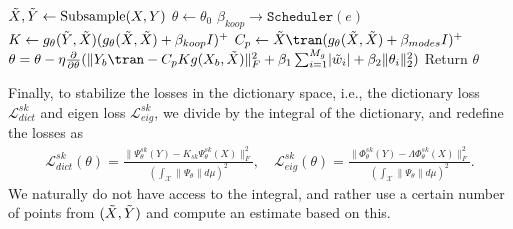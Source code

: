 \documentclass{article}
\begin{document}
\begin{minipage}{1.0\linewidth}
    \begin{algorithm}[H]
        \caption{Dictionary learning for kEDMD, using a parameterized kernel \(g_{\theta}\). As input it takes snapshots from the dynamical system \((X,Y)\), initial parameter value \(\theta_0\), learning rate \(\eta > 0\), regularization constant \(\beta_1, \beta_2, \beta_{modes} > 0\), in addition a \(\texttt{Scheduler}\) for the regularization constant \(\beta_{koop} >0\), and number of epochs.}\label{alg:dl_kedmd}
        \begin{algorithmic}
            \State $\Tilde X, \Tilde Y \leftarrow \text{Subsample}(X,Y)$
            \State $\theta \leftarrow \theta_0$
                \State $\beta_{koop} \rightarrow \texttt{Scheduler}(e)$
                    \State $K \leftarrow g_{\theta}(\Tilde Y, \Tilde X) (g_{\theta}(\Tilde X, \Tilde X) + \beta_{koop} I)^+$
                    \State $C_p \leftarrow \Tilde X\tran (g_{\theta}(\Tilde X, \Tilde X) + \beta_{modes} I)^+$
                    \State $\theta = \theta - \eta \frac{\partial}{\partial \theta} (\lVert Y_b\tran - C_pK g(X_b, \Tilde X)\rVert^2_F +  \beta_1\sum_{i=1}^{M_g}  \lvert \Tilde w_i\rvert + \beta_2 \lVert \theta_i\rVert^2_2)$
            \EndFor
            \EndFor
            \State Return $\theta$
            \EndProcedure
    \end{algorithmic}
    \end{algorithm}
\end{minipage}

Finally, to stabilize the losses in the dictionary space, i.e., the dictionary loss \(\mathcal{L}_{dict}^{sk}\) and eigen loss \(\mathcal{L}_{eig}^{sk}\), we divide by the integral of the dictionary, and redefine the losses as
\begin{align*}
   \mathcal{L}_{dict}^{sk}(\theta) = \frac{\lVert \Psi^{sk}_{\theta}(Y) - K_{sk} \Psi^{sk}_{\theta}(X)\rVert_F^2}{(\int_{\mathcal{X}} \lVert \Psi_{\theta}\rVert d\mu)^2},\quad 
   \mathcal{L}_{eig}^{sk}(\theta) = \frac{\lVert \Phi^{sk}_{\theta}(Y) - \Lambda \Phi^{sk}_{\theta}(X) \rVert_F^2}{(\int_{\mathcal{X}} \lVert \Psi_{\theta}\rVert d\mu)^2}.
\end{align*}
We naturally do not have access to the integral, and rather use a certain number of points from \((\Tilde X, \Tilde Y)\) and compute an estimate based on this. 
\end{document}
